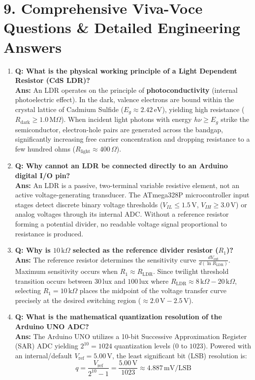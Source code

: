 \documentclass[10pt,a4paper]{article}
\begin{document}
\section*{9. Comprehensive Viva-Voce Questions \& Detailed Engineering Answers}
\begin{enumerate}[leftmargin=*]
    \item \textbf{Q: What is the physical working principle of a Light Dependent Resistor (CdS LDR)?}\\
    \textbf{Ans:} An LDR operates on the principle of \textbf{photoconductivity} (internal photoelectric effect). In the dark, valence electrons are bound within the crystal lattice of Cadmium Sulfide ($E_g \approx 2.42\,\text{eV}$), yielding high resistance ($R_{\text{dark}} \ge 1.0\,\text{M}\Omega$). When incident light photons with energy $h\nu \ge E_g$ strike the semiconductor, electron-hole pairs are generated across the bandgap, significantly increasing free carrier concentration and dropping resistance to a few hundred ohms ($R_{\text{light}} \approx 400\,\Omega$).

    \item \textbf{Q: Why cannot an LDR be connected directly to an Arduino digital I/O pin?}\\
    \textbf{Ans:} An LDR is a passive, two-terminal variable resistive element, not an active voltage-generating transducer. The ATmega328P microcontroller input stages detect discrete binary voltage thresholds ($V_{IL} \le 1.5\,\text{V}$, $V_{IH} \ge 3.0\,\text{V}$) or analog voltages through its internal ADC. Without a reference resistor forming a potential divider, no readable voltage signal proportional to resistance is produced.

    \item \textbf{Q: Why is $10\,\text{k}\Omega$ selected as the reference divider resistor ($R_1$)?}\\
    \textbf{Ans:} The reference resistor determines the sensitivity curve $\frac{dV_{\text{out}}}{d(\ln R_{\text{LDR}})}$. Maximum sensitivity occurs when $R_1 \approx R_{\text{LDR}}$. Since twilight threshold transition occurs between $30\,\text{lux}$ and $100\,\text{lux}$ where $R_{\text{LDR}} \approx 8\,\text{k}\Omega - 20\,\text{k}\Omega$, selecting $R_1 = 10\,\text{k}\Omega$ places the midpoint of the voltage transfer curve precisely at the desired switching region ($\approx 2.0\,\text{V} - 2.5\,\text{V}$).

    \item \textbf{Q: What is the mathematical quantization resolution of the Arduino UNO ADC?}\\
    \textbf{Ans:} The Arduino UNO utilizes a 10-bit Successive Approximation Register (SAR) ADC yielding $2^{10} = 1024$ quantization levels ($0$ to $1023$). Powered with an internal/default $V_{\text{ref}} = 5.00\,\text{V}$, the least significant bit (LSB) resolution is:
    $$q = \frac{V_{\text{ref}}}{2^{10} - 1} = \frac{5.00\,\text{V}}{1023} \approx 4.887\,\text{mV/LSB}$$


\end{enumerate}
\end{document}
